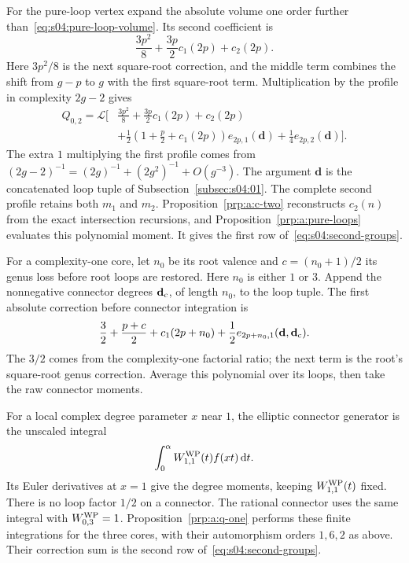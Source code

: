 \begin{prf}
For the pure-loop vertex expand the absolute volume one order further
than~\eqref{eq:s04:pure-loop-volume}. Its second coefficient is
\[
 \frac{3p^2}{8}+\frac{3p}{2}c_1(2p)+c_2(2p).
\]
Here $3p^2/8$ is the next square-root correction, and the middle
term combines the shift from $g-p$ to $g$ with the first square-root
term. Multiplication by the profile in complexity $2g-2$ gives
\begin{equation}\label{eq:s04:q-zero-mechanism}
\begin{aligned}
 Q_{0,2}=\mathcal L\biggl[&\frac{3p^2}{8}
   +\frac{3p}{2}c_1(2p)+c_2(2p)\\
 &+\frac12\left(1+\frac p2+c_1(2p)\right)e_{2p,1}(\mathbf d)
       +\frac14e_{2p,2}(\mathbf d)\biggr].
\end{aligned}
\end{equation}
The extra $1$ multiplying the first profile comes from
$(2g-2)^{-1}=(2g)^{-1}+(2g^2)^{-1}+O(g^{-3})$.
The argument $\mathbf d$ is the concatenated loop tuple of
Subsection~\ref{subsec:s04:01}. The complete second profile retains
both $m_1$ and $m_2$. Proposition~\ref{prp:a:c-two} reconstructs
$c_2(n)$ from the exact intersection recursions, and
Proposition~\ref{prp:a:pure-loops} evaluates this polynomial moment.
It gives the first row of~\eqref{eq:s04:second-groups}.

For a complexity-one core, let $n_0$ be its root valence and
$c=(n_0+1)/2$ its genus loss before root loops are restored.
Here $n_0$ is either $1$ or $3$. Append the nonnegative connector
degrees $\mathbf d_{\rm c}$, of length $n_0$, to the loop tuple.
The first absolute correction before connector integration is
\begin{equation}\label{eq:s04:q-one-mechanism}
 \frac32+\frac{p+c}{2}+c_1(2p+n_0)
       +\frac12e_{2p+n_0,1}(\mathbf d,\mathbf d_{\rm c}).
\end{equation}
The $3/2$ comes from the complexity-one factorial ratio; the next
term is the root's square-root genus correction. Average this
polynomial over its loops, then take the raw connector moments.

For a local complex degree parameter $x$ near $1$, the elliptic
connector generator is the unscaled integral
\[
 \int_0^\alpha W^{\rm WP}_{1,1}(t)f(xt)\,\mathrm{d} t.
\]
Its Euler derivatives at $x=1$ give the degree moments, keeping
$W^{\rm WP}_{1,1}(t)$ fixed. There is no loop factor $1/2$ on a
connector. The rational connector uses the same integral with
$W^{\rm WP}_{0,3}=1$. Proposition~\ref{prp:a:q-one} performs these
finite integrations for the three cores, with their automorphism
orders $1,6,2$ as above. Their correction sum is the second row
of~\eqref{eq:s04:second-groups}.


\end{prf}

